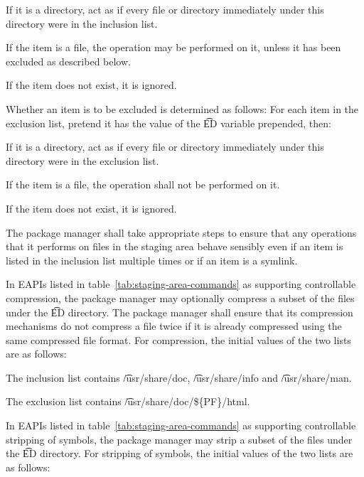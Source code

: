 \begin{compactitem}
\item If it is a directory, act as if every file or directory immediately under this directory
    were in the inclusion list.
\item If the item is a file, the operation may be performed on it, unless it has been excluded as
    described below.
\item If the item does not exist, it is ignored.
\end{compactitem}

Whether an item is to be excluded is determined as follows: For each item in the exclusion list,
pretend it has the value of the \t{ED} variable prepended, then:

\begin{compactitem}
\item If it is a directory, act as if every file or directory immediately under this directory
    were in the exclusion list.
\item If the item is a file, the operation shall not be performed on it.
\item If the item does not exist, it is ignored.
\end{compactitem}

The package manager shall take appropriate steps to ensure that any operations that it performs on
files in the staging area behave sensibly even if an item is listed in the inclusion list multiple
times or if an item is a symlink.

 In EAPIs listed in table~\ref{tab:staging-area-commands} as supporting
controllable compression, the package manager may optionally compress a subset of the files under
the \t{ED} directory. The package manager shall ensure that its compression mechanisms do not
compress a file twice if it is already compressed using the same compressed file format.
For compression, the initial values of the two lists are as follows:

\begin{compactitem}
\item The inclusion list contains \t{/usr/share/doc}, \t{/usr/share/info} and \t{/usr/share/man}.
\item The exclusion list contains \t{/usr/share/doc/\$\{PF\}/html}.
\end{compactitem}

 In EAPIs listed in table~\ref{tab:staging-area-commands} as supporting
controllable stripping of symbols, the package manager may strip a subset of the files under the
\t{ED} directory. For stripping of symbols, the initial values of the two lists are as follows:

